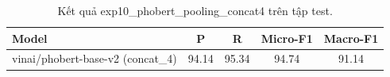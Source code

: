 \begin{table}[t]
\centering
\begin{tabular}{lcccc}
\hline
\textbf{Model} & \textbf{P} & \textbf{R} & \textbf{Micro-F1} & \textbf{Macro-F1} \\
\hline
vinai/phobert-base-v2 (concat_4) & 94.14 & 95.34 & 94.74 & 91.14 \\
\hline
\end{tabular}
\caption{Kết quả exp10_phobert_pooling_concat4 trên tập test.}
\label{tab:main}
\end{table}